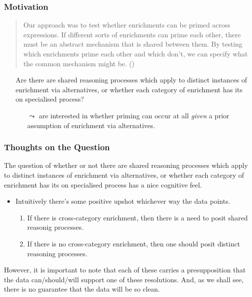 \documentclass[noamssymb]{beamer}
\newcommand{\hand}{\ding{43}}
\begin{document}
\begin{frame}
  \maketitle
\end{frame}


\begin{frame}
  \frametitle{{\ftf Motivation}}

  \begin{quote}
    Our approach was to test whether enrichments can be primed across expressions.
    If different sorts of enrichments can prime each other, there must be an abstract mechanism that is shared between them.
    By testing which enrichments prime each other and which don’t, we can specify what the common mechanism might be.\nolinebreak
    \hfill(\citeyear[118]{Bott:2016aa})
\end{quote}

\begin{itemize}
\item[\hand] Are there are shared reasoning processes which apply to distinct instances of enrichment via alternatives, or whether each category of enrichment has its on specialised process?
  \begin{itemize}
  \item[\(\leadsto\)] \citeauthor{Bott:2016aa} are interested in whether priming can occur at all \emph{given} a prior assumption of enrichment via alternatives.
  \end{itemize}
\end{itemize}
\end{frame}

\begin{frame}
  \frametitle{{\ftf Thoughts on the Question}}
 The question of whether or not there are shared reasoning processes which apply to distinct instances of enrichment via alternatives, or whether each category of enrichment has its on specialised process has a nice cognitive feel.

 \begin{itemize}
  \item Intuitively there's some positive upshot whichever way the data points.
    \begin{enumerate}[label=(\roman*)]
    \item If there is cross-category enrichment, then there is a need to posit shared reasonig processes.
    \item If there is no cross-category enrichment, then one should posit distinct reasoning processes.
    \end{enumerate}
    \end{itemize}
  However, it is important to note that each of these carries a presupposition that the data can/should/will support one of these resolutions.
  And, as we shall see, there is no guarantee that the data will be so clean.

\end{frame}
\end{document}
